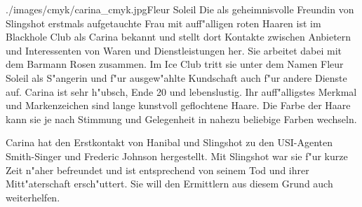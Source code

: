 
\begin{sideimagebox}[r]{0.6}{./images/cmyk/carina_cmyk.jpg}{Fleur Soleil}
    Die als geheimnisvolle Freundin von Slingshot erstmals aufgetauchte Frau mit auff"alligen roten Haaren ist im Blackhole Club als Carina bekannt und stellt dort Kontakte zwischen Anbietern und Interessenten von Waren und Dienstleistungen her. Sie arbeitet dabei mit dem Barmann Rosen zusammen. Im Ice Club tritt sie unter dem Namen Fleur Soleil als S"angerin und f"ur ausgew"ahlte Kundschaft auch f"ur andere Dienste auf. Carina ist sehr h"ubsch, Ende 20 und lebenslustig. Ihr auff"alligstes Merkmal und Markenzeichen sind lange kunstvoll geflochtene Haare. Die Farbe der Haare kann sie je nach Stimmung und Gelegenheit in nahezu beliebige Farben wechseln.

    Carina hat den Erstkontakt von Hanibal und Slingshot zu den USI-Agenten Smith-Singer und Frederic Johnson hergestellt. Mit Slingshot war sie f"ur kurze Zeit n"aher befreundet und ist entsprechend von seinem Tod und ihrer Mitt"aterschaft ersch"uttert. Sie will den Ermittlern aus diesem Grund auch weiterhelfen.
\end{sideimagebox}
\vfill\pagebreak
